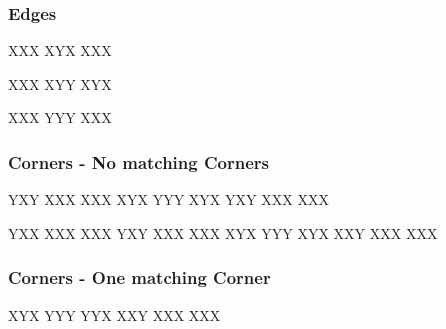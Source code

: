 \documentclass[9pt,dvipsnames]{extarticle}
\begin{document}
\begin{multicols*}{4}
\subsubsection*{Edges}

\RubikCubeGreyAll
\noindent
\RubikFaceUp
{X}{X}{X}
{X}{Y}{X}
{X}{X}{X}%

\RubikCubeGreyAll
\noindent
\RubikFaceUp
{X}{X}{X}
{X}{Y}{Y}
{X}{Y}{X}%

\RubikCubeGreyAll
\noindent
\RubikFaceUp
{X}{X}{X}
{Y}{Y}{Y}
{X}{X}{X}%

\subsubsection*{Corners - No matching Corners}

\noindent
\RubikFaceBack
{Y}{X}{Y}
{X}{X}{X}
{X}{X}{X}%
\RubikFaceUp
{X}{Y}{X}
{Y}{Y}{Y}
{X}{Y}{X}%
\RubikFaceFront
{Y}{X}{Y}
{X}{X}{X}
{X}{X}{X}%


\RubikCubeGreyAll%
\RubikFaceBack%
{Y}{X}{X}
{X}{X}{X}
{X}{X}{X}
\RubikFaceLeft%
{Y}{X}{Y}
{X}{X}{X}
{X}{X}{X}
\RubikFaceUp%
{X}{Y}{X}
{Y}{Y}{Y}
{X}{Y}{X}
\RubikFaceFront%
{X}{X}{Y}
{X}{X}{X}
{X}{X}{X}

\subsubsection*{Corners - One matching Corner}

\RubikCubeGreyAll%
\RubikFaceUp%
{X}{Y}{X}
{Y}{Y}{Y}
{Y}{Y}{X}%
\RubikFaceFront%
{X}{X}{Y}
{X}{X}{X}
{X}{X}{X}


\end{multicols*}
\end{document}
